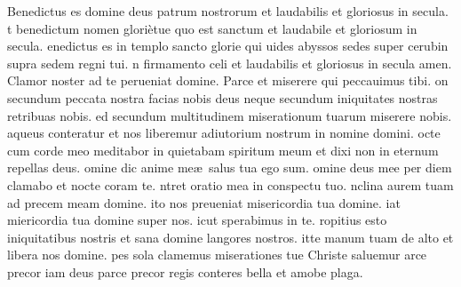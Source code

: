 \documentclass[letter,12pt]{book}
\newcommand*\zallmancaps{\usefont{U}{Zallman}{xl}{n}}
\begin{document}
\lettrine[lines=2]{\color{Red} \zallmancaps B}{}enedictus es domine deus patrum nostrorum et laudabilis et gloriosus in secula.
t benedictum nomen gloriètue quo est sanctum et laudabile et gloriosum in secula.
enedictus es in templo sancto glorie qui uides abyssos sedes super cerubin supra sedem regni tui.
n firmamento celi et laudabilis et gloriosus in secula amen.
\lettrine[lines=2]{\color{Red} \zallmancaps C}{}lamor noster ad te perueniat domine.
\newline Parce et miserere qui peccauimus tibi.
on secundum peccata nostra facias nobis deus neque secundum iniquitates nostras retribuas nobis.
ed secundum multitudinem miserationum tuarum miserere nobis.
aqueus conteratur et nos liberemur adiutorium nostrum in nomine domini.
octe cum corde meo meditabor in quietabam
spiritum meum et dixi non in eternum repellas deus.
omine dic anime me\ae \ salus tua ego sum.
omine deus mee per diem clamabo et nocte coram te.
ntret oratio mea in conspectu tuo.
nclina aurem tuam ad precem meam domine.
ito nos preueniat misericordia tua domine.
iat miericordia tua domine super nos.
icut sperabimus in te.
ropitius esto iniquitatibus nostris et sana domine langores nostros.
itte manum tuam de alto et libera nos domine.
pes sola clamemus miserationes tue Christe saluemur
arce precor iam deus parce precor regis conteres bella et amobe plaga.
\end{document}
